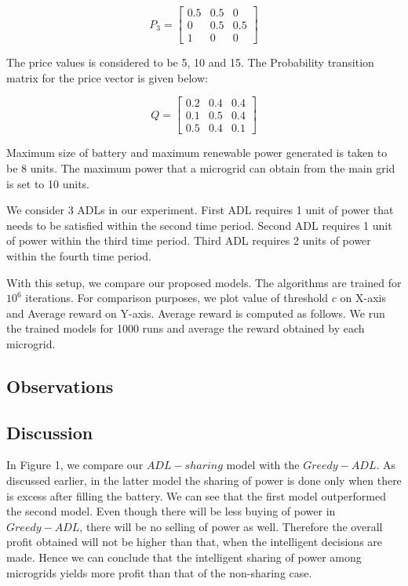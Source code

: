\[
P_{3}=
\begin{bmatrix}
0.5 & 0.5 & 0 \\
0 & 0.5 & 0.5 \\
1 & 0 & 0
\end{bmatrix}
\]




The price values is considered to be 5, 10 and 15. The Probability transition matrix for the price vector is given below:



\[
Q=
\begin{bmatrix}
0.2 & 0.4 & 0.4 \\
0.1 & 0.5 & 0.4 \\
0.5 & 0.4 & 0.1
\end{bmatrix}
\]


Maximum size of battery and maximum renewable power generated is taken to be 8 units. The maximum power that a microgrid can obtain from the main grid is set to 10 units.

We consider 3 ADLs in our experiment. First ADL requires 1 unit of power that needs to be satisfied within the second time period. Second ADL requires 1 unit of power within the third time period. Third ADL requires 2 units of power within the fourth time period.

With this setup, we compare our proposed models. The algorithms are trained for $10^6$ iterations. For comparison purposes, we plot value of threshold $c$ on X-axis and Average reward on Y-axis. Average reward is computed as follows. We run the trained models for 1000 runs and average the reward obtained by each microgrid. 

\subsection{Observations}

\subsection{Discussion}

In Figure 1, we compare our $ADL-sharing$ model with the $Greedy- ADL$. As discussed earlier, in the latter model the sharing of power is done only when there is excess after filling the battery. We can see that the first model outperformed the second model. Even though there will be less buying of power in $Greedy-ADL$, there will be no selling of power as well. Therefore  the overall profit obtained will not be higher than that, when the intelligent decisions are made. Hence we can conclude that the intelligent sharing of power among microgrids yields more profit than that of the non-sharing case. 

